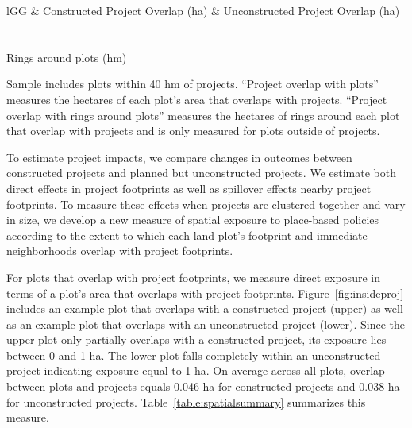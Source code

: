 \documentclass[12pt]{article}
\begin{document}
\begin{table}
\small
\centering
\caption{Spatial Exposure Summary Statistics}\label{table:spatialsummary}
\vspace{-2mm}
\begin{threeparttable}
\begin{tabular}{lGG}
\toprule
& Constructed Project Overlap (ha) & Unconstructed  Project Overlap (ha) \\
\midrule
\\[-.7em]

\\[-.5em]
\hspace{2em}Rings around plots (hm)   \\

\bottomrule
\end{tabular}
\begin{tablenotes}
\item \footnotesize Sample includes plots within 40 hm of projects.  ``Project overlap with plots'' measures the hectares of each plot's area that overlaps with projects.  ``Project overlap with rings around plots'' measures the hectares of rings around each plot that overlap with projects and is only measured for plots outside of projects.
\end{tablenotes}
\end{threeparttable}
\end{table}



To estimate project impacts, we compare changes in outcomes between constructed projects and planned but unconstructed projects.  We estimate both direct effects in project footprints as well as spillover effects nearby project footprints.  To measure these effects when projects are clustered together and vary in size, we develop a new measure of spatial exposure to place-based policies according to the extent to which each land plot's footprint and immediate neighborhoods overlap with project footprints.  

For plots that overlap with project footprints, we measure direct exposure in terms of a plot's area that overlaps with project footprints.  Figure~\ref{fig:insideproj} includes an example plot that overlaps with a constructed project (upper) as well as an example plot that overlaps with an unconstructed project (lower).  Since the upper plot only partially overlaps with a constructed project, its exposure lies between 0 and 1 ha.  The lower plot falls completely within an unconstructed project indicating exposure equal to 1 ha.  On average across all plots, overlap between plots and projects equals 0.046 ha for constructed projects and 0.038 ha for unconstructed projects. Table~\ref{table:spatialsummary} summarizes this measure.
\end{document}

